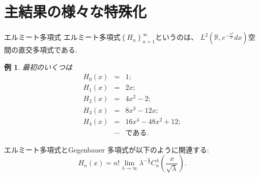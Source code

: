 \documentclass[pdf,notes]{beamer}
\newtheorem*{example*}{例}
\begin{document}
\section{主結果の様々な特殊化}
\begin{frame}{エルミート多項式}
エルミート多項式$\left\{ H_n \right\}_{n=1}^\infty$というのは、
	$L^2\left( \mathbb{R},e^{-\frac{x^2}{2}}dx \right)$空間の直交多項式である.
	\begin{example*}
		最初のいくつは
	\vspace{-0.3cm}
		\begin{eqnarray*}
		H_0(x)&=& 1;\\
		H_1(x)&=& 2x;\\
		H_2(x)&=& 
		4x^2-2;\\
		H_3(x)&=& 8x^3-12x;\\
		H_4(x)&=& 16x^4-48x^2+12;\\
		&\cdots&\mbox{である.}
		\end{eqnarray*}
	\end{example*}
	エルミート多項式とGegenbauer 多項式が以下のように関連する:
	\begin{equation*}
			H_n (x) = n! \lim_{\lambda \rightarrow \infty} \lambda^{- \frac{n}{2}}
			C_n^{\lambda} \left( \frac{x}{\sqrt{\lambda}} \right).
	\end{equation*}
\end{frame}
\end{document}
